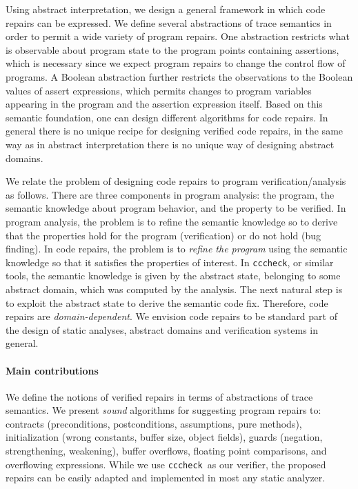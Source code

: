 \documentclass[10pt]{sigplanconf}
\newcommand{\code}[1]{\texttt{#1}}
\newcommand{\clousot}{\code{cccheck}}
\begin{document}
Using abstract interpretation, we design a general framework in which code repairs can be expressed.
We define several abstractions of trace semantics in order to permit a wide variety of program repairs. 
One abstraction restricts what is observable about program state to the
program points containing assertions, which is necessary since we
expect program repairs to change the control flow of programs. 
A Boolean abstraction further restricts the observations to the Boolean values of assert expressions, which permits changes to program variables appearing in the program and the assertion expression itself.
Based on this semantic foundation, one can design different algorithms for code repairs.
In general there is no unique recipe for designing verified code repairs, in the same way as in abstract interpretation there is no unique way of designing abstract domains.

We relate the problem of designing code repairs to program verification/analysis as follows.
There are three components in program analysis: the program, the semantic knowledge about program behavior, and the property to be verified.
In program analysis, the problem is to refine the semantic knowledge so to derive that the properties hold for the program (verification) or do not hold (bug finding).
In code repairs, the problem is to \emph{refine the program} using the semantic knowledge so that it satisfies the properties of interest.
In \clousot, or similar tools, the semantic knowledge is given by the abstract state, belonging to some abstract domain, which was computed by the analysis.
The next natural step is to exploit the abstract state to derive the semantic code fix.
Therefore, code repairs are \emph{domain-dependent}.
We envision code repairs to be standard part of the design of static analyses, abstract domains and verification systems in general.

\paragraph{Main contributions}
We define the notions of verified repairs in terms of abstractions of trace semantics.
We present \emph{sound} algorithms
for suggesting program repairs to: contracts
(preconditions, postconditions, assumptions, pure methods),
initialization (wrong constants, buffer size, object fields), guards
(negation, strengthening, weakening),  buffer overflows, floating
point comparisons, and overflowing expressions.  While we use
\clousot\ as our verifier, the proposed
repairs can be easily adapted and implemented in most any  static analyzer.
\end{document}
